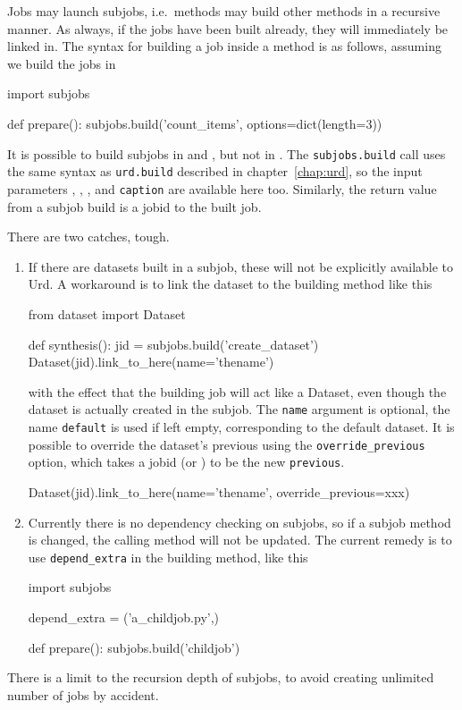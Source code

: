 Jobs may launch subjobs, i.e.\ methods may build other methods in a
recursive manner.  As always, if the jobs have been built already,
they will immediately be linked in.  The syntax for building a job
inside a method is as follows, assuming we build the jobs in \prepare
\begin{python}
import subjobs

def prepare():
    subjobs.build('count_items', options=dict(length=3))
\end{python}
It is possible to build subjobs in \prepare and \synthesis, but not in
\analysis.    The \texttt{subjobs.build} call uses the
same syntax as \texttt{urd.build} described in chapter~\ref{chap:urd}, so
the input parameters \options, \datasets, \jobids, and
\texttt{caption} are available here too.  Similarly, the return value
from a subjob build is a jobid to the built job.

There are two catches, tough.
\begin{enumerate}
  \item
If there are datasets built in a subjob,
these will not be explicitly available to Urd.  A workaround is to
link the dataset to the building method like this
\begin{python}
from dataset import Dataset

def synthesis():
    jid = subjobs.build('create_dataset')
    Dataset(jid).link_to_here(name='thename')
\end{python}
with the effect that the building job will act like a Dataset, even
though the dataset is actually created in the subjob.  The
\texttt{name} argument is optional, the name \texttt{default} is used
if left empty, corresponding to the default dataset.  It is possible
to override the dataset's previous using
the \texttt{override\_previous} option, which takes a jobid
(or \pyNone) to be the new \texttt{previous}.
\begin{python}
Dataset(jid).link_to_here(name='thename', override_previous=xxx)
\end{python}


\item
Currently there is no dependency checking on subjobs, so if a subjob
method is changed, the calling method will not be updated.  The
current remedy is to use \texttt{depend\_extra} in the building
method, like this
\begin{python}
import subjobs

depend_extra = ('a_childjob.py',)

def prepare():
    subjobs.build('childjob')
\end{python}
\end{enumerate}
There is a limit to the recursion depth of subjobs, to avoid creating
unlimited number of jobs by accident.




